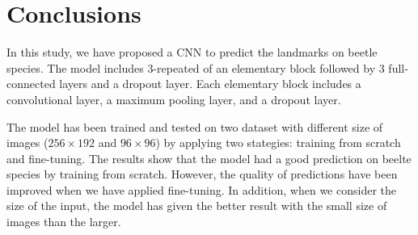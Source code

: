 \documentclass[12pt,a4paper]{article}
\begin{document}
\section{Conclusions}
In this study, we have proposed a CNN to predict the landmarks on beetle species. The model includes 3-repeated of an elementary block followed by 3 full-connected layers and a dropout layer. Each elementary block includes a convolutional layer, a maximum pooling layer, and a dropout layer.

The model has been trained and tested on two dataset with different size of images ($256 \times 192$ and $96 \times 96$) by applying two stategies: training from scratch and fine-tuning. The results show that the model had a good prediction on beelte species by training from scratch. However, the quality of predictions have been improved when we have applied fine-tuning. In addition, when we consider the size of the input, the model has given the better result with the small size of images than the larger.  



\end{document}
